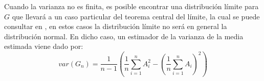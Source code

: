 \documentclass[../proyecto.tex]{memoir}
\begin{document}
Cuando la varianza no es finita, es posible encontrar una distribución límite para $G$ que llevará a un caso particular del teorema central del límite, la cual se puede consultar en \cite{elLibro}, en estos casos la distribución límite no será en general la distribución normal. En dicho caso, un estimador de la varianza de la media estimada viene dado por:
$$
var(G_n) = \frac{1}{n-1} \left( \frac{1}{n} \sum_{i=1}^n A_i^2 - \left( \frac{1}{n} \sum_{i=1}^n A_i \right)^2 \right)
$$
\end{document}
